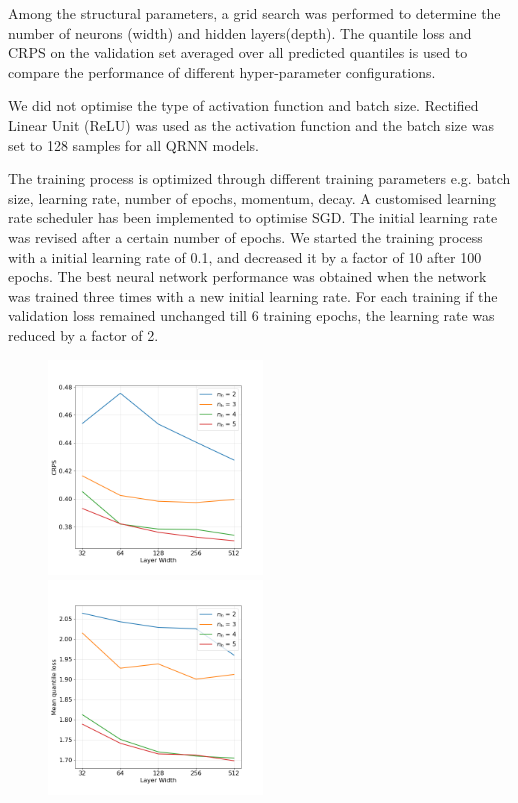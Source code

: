\documentclass[amt, manuscript]{copernicus}
\begin{document}
Among the structural parameters, a grid search was performed to determine the number of neurons (width) and hidden layers(depth). The quantile loss and CRPS on the validation set averaged over all predicted quantiles is used to compare the performance of different hyper-parameter configurations. 

We did not optimise the type of activation function and batch size. Rectified Linear Unit (ReLU) was used as the activation function  and the batch size was set to 128 samples for all QRNN models. 

The training process is optimized through different training parameters e.g. batch size, learning rate, number of epochs, momentum, decay. A customised  learning rate scheduler has been implemented to optimise SGD. The initial learning rate was revised after a certain number of epochs.  We started the training process with a initial learning rate of 0.1, and decreased it by a factor of 10 after 100 epochs. The best neural network performance was obtained when the network was trained three times with a new initial learning rate. For each training  if the validation loss remained unchanged till 6 training epochs, the learning rate was reduced by a factor of 2. 

\begin{figure}[p]
	\centering
	\includegraphics[height=57mm]{Figures/CRPS.png} 
	\includegraphics[height=57mm]{Figures/quantile_loss.png}
	\caption{}
	\label{fig:}	
\end{figure}
\end{document}
